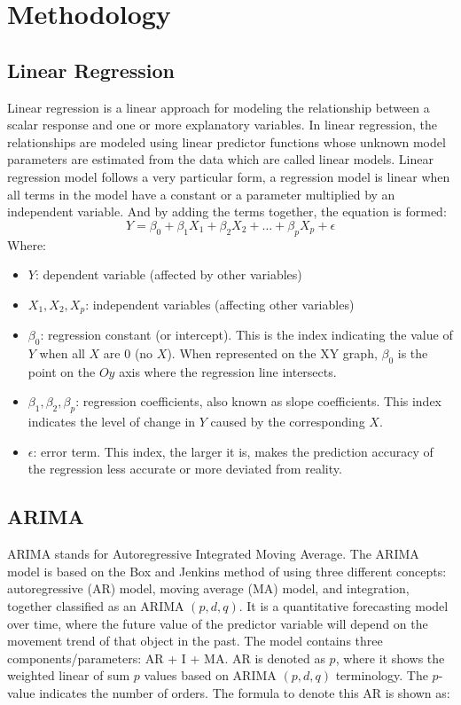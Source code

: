 \documentclass[conference]{IEEEtran}
\begin{document}
\newpage
\section{Methodology}
\subsection{Linear Regression}
Linear regression is a linear approach for modeling the relationship between a scalar response and one or more explanatory variables. In linear regression, the relationships are modeled using linear predictor functions whose unknown model parameters are estimated from the data which are called linear models. Linear regression model follows a very particular form, a regression model is linear when all terms in the model have a constant or a parameter multiplied by an independent variable. And by adding the terms together, the equation is formed:
\[ Y = \beta_0 + \beta_1 X_1 + \beta_2 X_2 + \ldots + \beta_p X_p + \epsilon \]
Where:
\begin{itemize}
    \item $Y$: dependent variable (affected by other variables)
    \item $X_1, X_2, X_p$: independent variables (affecting other variables)
    \item $\beta_0$: regression constant (or intercept). This is the index indicating the value of $Y$ when all $X$ are 0 (no $X$). When represented on the XY graph, $\beta_0$ is the point on the $Oy$ axis where the regression line intersects.
    \item $\beta_1, \beta_2, \beta_p$: regression coefficients, also known as slope coefficients. This index indicates the level of change in $Y$ caused by the corresponding $X$.
    \item $\epsilon$: error term. This index, the larger it is, makes the prediction accuracy of the regression less accurate or more deviated from reality.
\end{itemize}



\subsection{ARIMA}

ARIMA stands for Autoregressive Integrated Moving Average. The ARIMA model is based on the Box and Jenkins method of using three different concepts: autoregressive (AR) model, moving average (MA) model, and integration, together classified as an ARIMA $(p, d, q)$. It is a quantitative forecasting model over time, where the future value of the predictor variable will depend on the movement trend of that object in the past. 
The model contains three components/parameters: AR + I + MA. AR is denoted as $p$, where it shows the weighted linear of sum $p$ values based on ARIMA $(p, d, q)$ terminology. The $p$-value indicates the number of orders. The formula to denote this AR is shown as:
\end{document}
